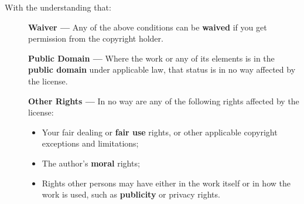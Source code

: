 \documentclass[12pt]{book}
\begin{document}
\vspace{1cm}
\noindent
With the understanding that:
\begin{description}
\item[] \textbf{Waiver —} Any of the above conditions can be \textbf{waived} if you get permission from the copyright holder.

\item[] \textbf{Public Domain —} Where the work or any of its elements is in the \textbf{public domain} under applicable law, that status is in no way affected by the license.

\item[] \textbf{Other Rights —} In no way are any of the following rights affected by the license:
\begin{itemize}
\item Your fair dealing or \textbf{fair use} rights, or other applicable copyright exceptions and limitations;
\item The author's \textbf{moral} rights;
\item Rights other persons may have either in the work itself or in how the work is used, such as \textbf{publicity} or privacy rights.
\end{itemize}
\end{description}

\ifx\wholebook\relax\else
% 
% 
	
\end{document}
